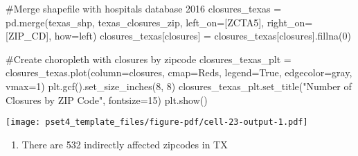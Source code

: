 \documentclass[
  letterpaper,
  DIV=11,
  numbers=noendperiod]{scrartcl}
\newenvironment{Shaded}{\begin{snugshade}}{\end{snugshade}}
\newcommand{\CommentTok}[1]{\textcolor[rgb]{0.37,0.37,0.37}{#1}}
\newcommand{\DecValTok}[1]{\textcolor[rgb]{0.68,0.00,0.00}{#1}}
\newcommand{\NormalTok}[1]{\textcolor[rgb]{0.00,0.23,0.31}{#1}}
\newcommand{\OperatorTok}[1]{\textcolor[rgb]{0.37,0.37,0.37}{#1}}
\newcommand{\StringTok}[1]{\textcolor[rgb]{0.13,0.47,0.30}{#1}}
\newcommand{\VariableTok}[1]{\textcolor[rgb]{0.07,0.07,0.07}{#1}}
\providecommand{\tightlist}{%
  \setlength{\itemsep}{0pt}\setlength{\parskip}{0pt}}\usepackage{longtable,booktabs,array}
\begin{document}
\begin{Shaded}
\begin{Highlighting}[]
\CommentTok{\#Merge shapefile with hospitals database 2016}
\NormalTok{closures\_texas }\OperatorTok{=}\NormalTok{ pd.merge(texas\_shp, texas\_closures\_zip, left\_on}\OperatorTok{=}\NormalTok{[}\StringTok{\textquotesingle{}ZCTA5\textquotesingle{}}\NormalTok{], right\_on}\OperatorTok{=}\NormalTok{[}\StringTok{\textquotesingle{}ZIP\_CD\textquotesingle{}}\NormalTok{], how}\OperatorTok{=}\StringTok{\textquotesingle{}left\textquotesingle{}}\NormalTok{)}
\NormalTok{closures\_texas[}\StringTok{\textquotesingle{}closures\textquotesingle{}}\NormalTok{] }\OperatorTok{=}\NormalTok{ closures\_texas[}\StringTok{\textquotesingle{}closures\textquotesingle{}}\NormalTok{].fillna(}\DecValTok{0}\NormalTok{)}

\CommentTok{\#Create choropleth with closures by zipcode}
\NormalTok{closures\_texas\_plt }\OperatorTok{=}\NormalTok{ closures\_texas.plot(column}\OperatorTok{=}\StringTok{\textquotesingle{}closures\textquotesingle{}}\NormalTok{, cmap}\OperatorTok{=}\StringTok{\textquotesingle{}Reds\textquotesingle{}}\NormalTok{, legend}\OperatorTok{=}\VariableTok{True}\NormalTok{, edgecolor}\OperatorTok{=}\StringTok{\textquotesingle{}gray\textquotesingle{}}\NormalTok{, vmax}\OperatorTok{=}\DecValTok{1}\NormalTok{)}
\NormalTok{plt.gcf().set\_size\_inches(}\DecValTok{8}\NormalTok{, }\DecValTok{8}\NormalTok{)}
\NormalTok{closures\_texas\_plt.set\_title(}\StringTok{"Number of Closures by ZIP Code"}\NormalTok{, fontsize}\OperatorTok{=}\DecValTok{15}\NormalTok{)}
\NormalTok{plt.show()}
\end{Highlighting}
\end{Shaded}

\texttt{[image: pset4\_template\_files/figure-pdf/cell-23-output-1.pdf]}

\begin{enumerate}
\def\labelenumi{\arabic{enumi}.}
\setcounter{enumi}{2}
\tightlist
\item
  There are 532 indirectly affected zipcodes in TX
\end{enumerate}
\end{document}
